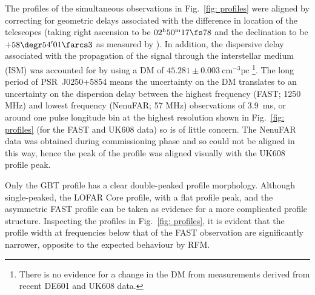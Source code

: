 The profiles of the simultaneous observations in Fig.~\ref{fig: profiles} were aligned by correcting for geometric delays associated with the difference in location of the telescopes (taking right ascension to be $02^\mathrm{h}50^\mathrm{m}17\fs78$  and the declination to be $+58\degr54'01\farcs3$ as measured by \citealt{TBC+2018}). In addition, the dispersive delay associated with the propagation of the signal through the interstellar medium (ISM) was accounted for by using a DM of $45.281\pm0.003\ \mathrm{cm}^{-3}\mathrm{pc}$ \citep{TBC+2018}\footnote{There is no evidence for a change in the DM from measurements derived from recent DE601 and UK608 data.}. The long period of PSR~J0250+5854 means the uncertainty on the DM translates to an uncertainty on the dispersion delay between the highest frequency (FAST; 1250 MHz) and lowest frequency (NenuFAR; 57 MHz) observations of 3.9~ms, or around one pulse longitude bin at the highest resolution shown in Fig.~\ref{fig: profiles} (for the FAST and UK608 data) so is of little concern. The NenuFAR data was obtained during commissioning phase and so could not be aligned in this way, hence the peak of the profile was aligned visually with the UK608 profile peak.

Only the GBT profile has a clear double-peaked profile morphology. Although single-peaked, the LOFAR Core profile, with a flat profile peak, and the asymmetric FAST profile can be taken as evidence for a more complicated profile structure. Inspecting the profiles in Fig.~\ref{fig: profiles}, it is evident that the profile width at frequencies below that of the FAST observation are significantly narrower, opposite to the expected behaviour by RFM. 


